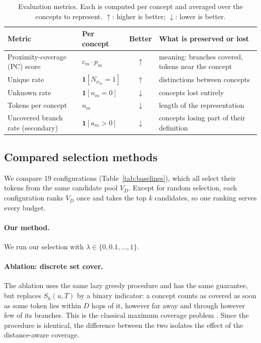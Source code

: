 \begin{table}[t]
\centering
\small
\renewcommand{\arraystretch}{1.3}
\setlength{\tabcolsep}{4pt}
\begin{tabular}{@{}llcl@{}}
\toprule
\textbf{Metric} & \textbf{Per concept} & \textbf{Better} & \textbf{What is preserved or lost} \\
\midrule
Proximity-coverage (PC) score & $c_m \cdot p_m$ & $\uparrow$ & meaning: branches covered, tokens near the concept \\
Unique rate & $\mathbf{1}[N_{\sigma_m} = 1]$ & $\uparrow$ & distinctions between concepts \\
Unknown rate & $\mathbf{1}[n_m = 0]$ & $\downarrow$ & concepts lost entirely \\
Tokens per concept & $n_m$ & $\downarrow$ & length of the representation \\
\midrule
Uncovered branch rate (secondary) & $\mathbf{1}[u_m > 0]$ & $\downarrow$ & concepts losing part of their definition \\
\bottomrule
\end{tabular}
\caption{Evaluation metrics. Each is computed per concept and averaged over the concepts to represent. $\uparrow$: higher is better; $\downarrow$: lower is better.}
\label{tab:metrics}
\end{table}

\subsection{Compared selection methods}
\label{sec:method:baselines}

We compare 19 configurations (Table~\ref{tab:baselines}), which all select their tokens from the same candidate pool $V_D$.
Except for random selection, each configuration ranks $V_D$ once and takes the top $k$ candidates, so one ranking serves every budget.

\paragraph{Our method.} We run our selection with $\lambda \in \{0, 0.1, \dots, 1\}$.

\paragraph{Ablation: discrete set cover.}
The ablation uses the same lazy greedy procedure and has the same guarantee, but replaces $S_h(u, T)$ by a binary indicator: a concept counts as covered as soon as some token lies within $D$ hops of it, however far away and through however few of its branches.
This is the classical maximum coverage problem \cite{nemhauser1978analysis, feige1998threshold}.
Since the procedure is identical, the difference between the two isolates the effect of the distance-aware coverage.


